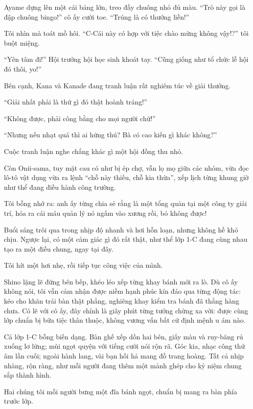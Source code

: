 \documentclass[../main.tex]{subfiles}
\begin{document}
Ayame dựng lên một cái bảng lớn, treo đầy chuông nhỏ đủ màu. ``Trò này gọi là đập chuông bingo!'' cô ấy cười toe. ``Trúng là có thưởng liền!''

Tôi nhìn mà toát mồ hôi. ``C-Cái này có hợp với tiệc chào mừng không vậy!?'' tôi buột miệng.

``Yên tâm đi!'' Hội trưởng hội học sinh khoát tay. ``Cũng giống như tổ chức lễ hội đó thôi, yo!''

Bên cạnh, Kana và Kanade đang tranh luận rất nghiêm túc về giải thưởng.

``Giải nhất phải là thứ gì đó thật hoành tráng!''

``Không được, phải công bằng cho mọi người chứ!''

``Nhưng nếu nhạt quá thì ai hứng thú? Bà có cao kiến gì khác không?''

Cuộc tranh luận nghe chẳng khác gì một hội đồng thu nhỏ.

Còn Onii-sama, tuy mặt cau có như bị ép chợ, vẫn lọ mọ giữa các nhóm, vừa đọc lô-tô vật dụng vừa ra lệnh ``chỗ này thiếu, chỗ kia thừa'', xếp lịch từng khung giờ như thể đang điều hành công trường.

Tôi bỗng nhớ ra: anh ấy từng chia sẻ rằng là một tổng quản tại một công ty giải trí, hóa ra cái máu quản lý nó ngấm vào xương rồi, bỏ không được!

Buổi sáng trôi qua trong nhịp độ nhanh và hơi hỗn loạn, nhưng không hề khó chịu. Ngược lại, có một cảm giác gì đó rất thật, như thể lớp 1-C đang cùng nhau tạo ra một điều chung, ngay tại đây.

Tôi hít một hơi nhẹ, rồi tiếp tục công việc của mình.

Shino lặng lẽ đứng bên bếp, khéo léo xếp từng khay bánh mới ra lò. Dù cô ấy không nói, tôi vẫn cảm nhận được niềm hạnh phúc kín đáo qua từng động tác: kéo cho khăn trải bàn thật phẳng, nghiêng khay kiểm tra bánh đã thẳng hàng chưa. Có lẽ với cô ấy, đây chính là giây phút từng tưởng chừng xa vời: được cùng lớp chuẩn bị bữa tiệc thân thuộc, không vương vấn bất cứ định mệnh u ám nào.

Cả lớp 1-C bỗng biến dạng. Bàn ghế xếp dồn hai bên, giấy màu và ruy-băng rủ xuống lơ lửng; mùi ngọt quyện với tiếng cười nói rộn rã. Góc kia, nhạc công thử âm lần cuối; ngoài hành lang, vài bạn hối hả mang đồ trang hoàng. Tất cả nhịp nhàng, rộn ràng, như mỗi người đang thêm một mảnh ghép cho kỷ niệm chung sắp thành hình.

Hai chúng tôi mỗi người bưng một đĩa bánh ngọt, chuẩn bị mang ra bàn phía trước lớp.
\end{document}
